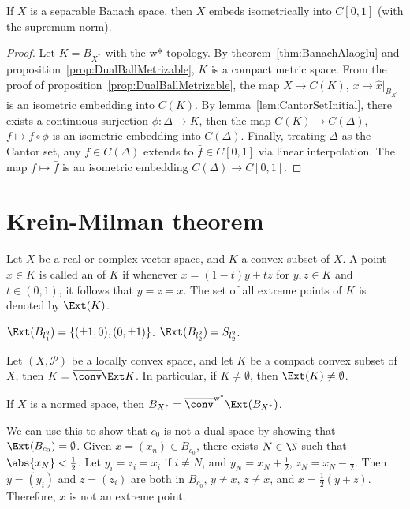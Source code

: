 \documentclass[a4paper]{article}
\begin{document}
\begin{nthm}\label{thm:C[0,1]Initial}
  If $X$ is a separable Banach space, then $X$ embeds isometrically into $C[0,1]$ (with the supremum norm).
\end{nthm}

\begin{proof}
  Let $K=B_{X^*}$ with the w*-topology. By theorem~\ref{thm:BanachAlaoglu} and proposition~\ref{prop:DualBallMetrizable}, $K$ is a compact metric space. From the proof of proposition~\ref{prop:DualBallMetrizable}, the map $X\to C(K)$, $x\mapsto\hat{x}|_{B_{X^*}}$ is an isometric embedding into $C(K)$. By lemma~\ref{lem:CantorSetInitial}, there exists a continuous surjection $\phi:\Delta\to K$, then the map $C(K)\to C(\Delta)$, $f\mapsto f\circ\phi$ is an isometric embedding into $C(\Delta)$. Finally, treating $\Delta$ as the Cantor set, any $f\in C(\Delta)$ extends to $\bar{f}\in C[0,1]$ via linear interpolation. The map $f\mapsto\bar{f}$ is an isometric embedding $C(\Delta)\to C[0,1]$.
\end{proof}

\newpage

\section{Krein-Milman theorem}
Let $X$ be a real or complex vector space, and $K$ a convex subset of $X$. A point $x\in K$ is called an  of $K$ if whenever $x=(1-t)y+tz$ for $y,z\in K$ and $t\in (0,1)$, it follows that $y=z=x$. The set of all extreme points of $K$ is denoted by $\Ext(K)$. 

\begin{eg}
  $\Ext(B_{l_1^2})=\{(\pm 1,0),(0,\pm 1)\}$. $\Ext(B_{l_2^2})=S_{l_2^2}$.
\end{eg}

\begin{nthm}\label{thm:KreinMilman}
  Let $(X,\mathcal{P})$ be a locally convex space, and let $K$ be a compact convex subset of $X$, then $K=\overline{\conv}\Ext K$. In particular, if $K\not=\emptyset$, then $\Ext(K)\not=\emptyset$.
\end{nthm}

\begin{ncor}
  If $X$ is a normed space, then $B_{X^*}=\overline{\conv}^{\mathrm{w^*}}\Ext(B_{X^*})$.
\end{ncor}

\begin{eg}
  We can use this to show that $c_0$ is not a dual space by showing that $\Ext(B_{c_0})=\emptyset$. Given $x=(x_n)\in B_{c_0}$, there exists $N\in\N$ such that $\abs{x_N}<\frac{1}{2}$. Let $y_i=z_i=x_i$ if $i\not= N$, and $y_N=x_N+\frac{1}{2}$, $z_N=x_N-\frac{1}{2}$. Then $y=(y_i)$ and $z=(z_i)$ are both in $B_{c_0}$, $y\not= x$, $z\not= x$, and $x=\frac{1}{2}(y+z)$. Therefore, $x$ is not an extreme point.
\end{eg}
\end{document}
